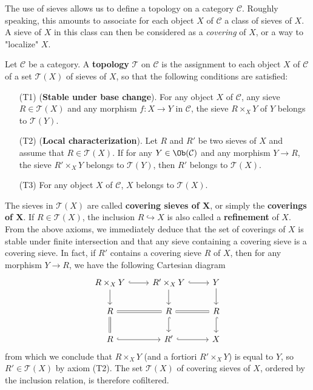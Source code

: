 The use of sieves allows us to define a topology on a category $\mathcal{C}$. Roughly speaking, this amounts to associate for each object $X$ of $\mathcal{C}$ a class of sieves of $X$. A sieve of $X$ in this class can then be considered as a \textit{covering} of $X$, or a way to "localize" $X$.
\begin{definition}
Let $\mathcal{C}$ be a category. A \textbf{topology} $\mathcal{T}$ on $\mathcal{C}$ is the assignment to each object $X$ of $\mathcal{C}$ of a set $\mathcal{T}(X)$ of sieves of $X$, so that the following conditions are satisfied:
\begin{enumerate}[leftmargin=40pt]
\item[(T1)] (\textbf{Stable under base change}). For any object $X$ of $\mathcal{C}$, any sieve $R\in\mathcal{T}(X)$ and any morphism $f:X\to Y$ in $\mathcal{C}$, the sieve $R\times_XY$ of $Y$ belongs to $\mathcal{T}(Y)$.
\item[(T2)] (\textbf{Local characterization}). Let $R$ and $R'$ be two sieves of $X$ and assume that $R\in\mathcal{T}(X)$. If for any $Y\in\Ob(\mathcal{C})$ and any morphism $Y\to R$, the sieve $R'\times_XY$ belongs to $\mathcal{T}(Y)$, then $R'$ belongs to $\mathcal{T}(X)$.
\item[(T3)] For any object $X$ of $\mathcal{C}$, $X$ belongs to $\mathcal{T}(X)$.
\end{enumerate}
\end{definition}
The sieves in $\mathcal{T}(X)$ are called \textbf{covering sieves of $\bm{X}$}, or simply the \textbf{coverings of $\bm{X}$}. If $R\in\mathcal{T}(X)$, the inclusion $R\hookrightarrow X$ is also called a \textbf{refinement} of $X$. From the above axioms, we immediately deduce that the set of coverings of $X$ is stable under finite intersection and that any sieve containing a covering sieve is a covering sieve. In fact, if $R'$ contains a covering sieve $R$ of $X$, then for any morphism $Y\to R$, we have the following Cartesian diagram
\[\begin{tikzcd}
R\times_XY\ar[r,hook]\ar[d]&R'\times_XY\ar[d]\ar[r,hook]&Y\ar[d]\\
R\ar[d,equal]\ar[r,equal]&R\ar[r,equal]\ar[d,hook]&R\ar[d,hook]\\
R\ar[r,hook]&R'\ar[r,hook]&X
\end{tikzcd}\]
from which we conclude that $R\times_XY$ (and a fortiori $R'\times_XY$) is equal to $Y$, so $R'\in\mathcal{T}(X)$ by axiom (T2). The set $\mathcal{T}(X)$ of covering sieves of $X$, ordered by the inclusion relation, is therefore cofiltered.\par
